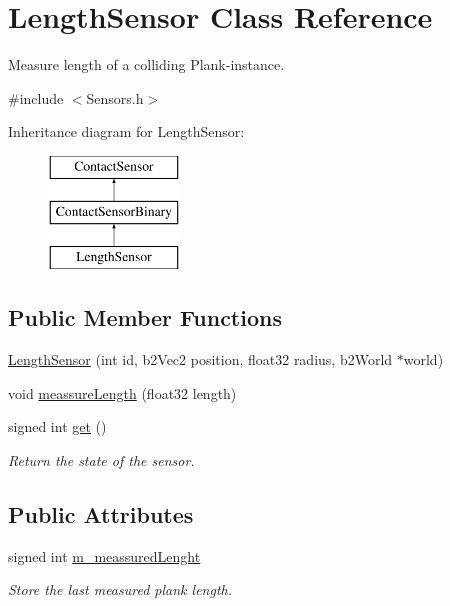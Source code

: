 \hypertarget{classLengthSensor}{\section{Length\-Sensor Class Reference}
\label{classLengthSensor}
}


Measure length of a colliding Plank-\/instance.  




{\ttfamily \#include $<$Sensors.\-h$>$}

Inheritance diagram for Length\-Sensor\-:\begin{figure}[H]
\begin{center}
\leavevmode
\includegraphics[height=3.000000cm]{classLengthSensor}
\end{center}
\end{figure}
\subsection*{Public Member Functions}
\begin{DoxyCompactItemize}
\item 
\hyperlink{classLengthSensor_aa691f5e5e97607b3f0979379fd958c3b}{Length\-Sensor} (int id, b2\-Vec2 position, float32 radius, b2\-World $\ast$world)
\item 
void \hyperlink{classLengthSensor_aae468465d3ab04b316f7553423feb4ff}{meassure\-Length} (float32 length)
\item 
signed int \hyperlink{classLengthSensor_a90d9ddfdeb189991d274026af6ab8681}{get} ()
\begin{DoxyCompactList}\small\item\em Return the state of the sensor. \end{DoxyCompactList}\end{DoxyCompactItemize}
\subsection*{Public Attributes}
\begin{DoxyCompactItemize}
\item 
signed int \hyperlink{classLengthSensor_a755a8b3fd195e6d20c1898016cc0efa2}{m\-\_\-meassured\-Lenght}
\begin{DoxyCompactList}\small\item\em Store the last measured plank length. \end{DoxyCompactList}\end{DoxyCompactItemize}


